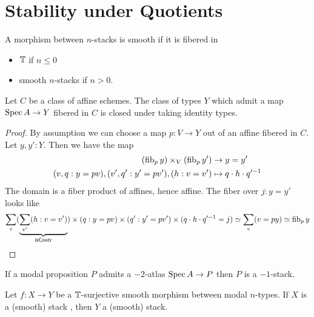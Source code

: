 \documentclass{article}
\begin{document}
\section{Stability under Quotients}
\begin{definition}
	A morphism between $n$-stacks is smooth if it is fibered in 
	\begin{itemize}
		\item $\mathbb{T}$ if $n \le 0$
		\item smooth $n$-stacks if $n > 0$.
	\end{itemize}
\end{definition}
\begin{lemma}{\label{lemma:havingAbstractAtlasClosedUnderId}}
	Let $C$ be a class of affine schemes. The class of types $Y$ which admit a map $\operatorname{Spec} A \to Y$ fibered in $C$ is closed under taking identity types.
\end{lemma}
\begin{proof}
	By assumption we can choose a map $p : V \to Y$ out of an affine fibered in $C$. Let $y,y' : Y$.  Then we have the map
	\begin{align*}
		(\operatorname{fib}_p y) \times_V (\operatorname{fib}_p y') &\to y = y' \\
		(v , q : y = p v) , (v', q' : y' = p v') , (h : v = v') &\mapsto q \cdot h \cdot q'^{-1}
	\end{align*}
	The domain is a fiber product of affines, hence affine.
	The fiber over $j : y = y'$ looks like  %
	\[
	\sum_{v}  ( \underbrace{\sum_{v'} (h : v = v')}_{\mathsf{isContr}}) \times (q : y = p v) \times (q'  : y' = p v') \times (q \cdot h \cdot q'^{-1} = j) \simeq \sum_v (v = py) \simeq \operatorname{fib}_p y
	\]
\end{proof}
\begin{lemma}[TODO]{\label{lemma:missing}}
	If a modal proposition $P$ admits  a $-2$-atlas $\operatorname{Spec} A \to P$ then $P$ is a $-1$-stack.
\end{lemma}
\begin{theorem}{\label{thm:quotients}}
	Let $f : X \to Y$ be a $\mathbb{T}$-surjective smooth morphism between modal $n$-types. If $X$ is a (smooth) stack , then $Y$ a  (smooth) stack.
\end{theorem}
\end{document}
